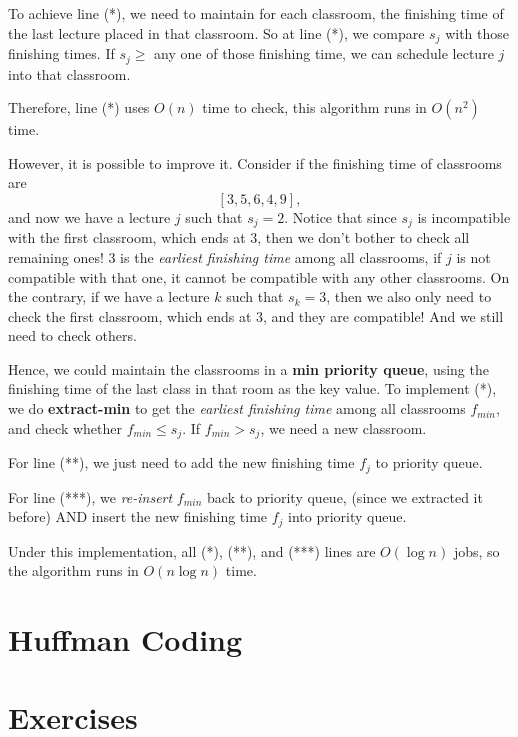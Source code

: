 \begin{spacing}{1.3}
    To achieve line (*), we need to maintain for each classroom, the finishing time 
    of the last lecture placed in that classroom. So at line (*), we compare 
    $s_j$ with those finishing times. If $s_j\ge $ any one of those finishing time,
    we can schedule lecture $j$ into that classroom.

    Therefore, line (*) uses $O(n)$ time to check, this algorithm runs in $O(n^2)$ time.

    However, it is possible to improve it. Consider if the finishing time of 
    classrooms are
    $$[3, 5, 6, 4, 9],$$
    and now we have a lecture $j$ such that $s_j=2$. Notice that since $s_j$ is 
    incompatible with the first classroom, which ends at 3, then we don't bother 
    to check all remaining ones! 3 is the {\it earliest finishing time} among all 
    classrooms, if $j$ is not compatible with that one, it cannot be compatible
    with any other classrooms. On the contrary, if we have a lecture $k$ such that 
    $s_k=3$, then we also only need to check the first classroom, which ends at 3, 
    and they are compatible! And we still need to check others.

    Hence, we could maintain the classrooms in a {\bf min priority queue}, 
    using the finishing time of the last class in that room as the key value.
    To implement (*), we do {\bf extract-min} to get the {\it earliest finishing
    time} among all classrooms $f_{min}$, and check whether $f_{min}\le s_j$.
    If $f_{min}> s_j$, we need a new classroom.

    For line (**), we just need to add the new finishing time $f_j$ to 
    priority queue.

    For line (***), we {\it re-insert} $f_{min}$ back to priority queue,
    (since we extracted it before) AND 
    insert the new finishing time $f_j$ into priority queue.

    Under this implementation, all (*), (**), and (***) lines are $O(\log n)$
    jobs, so the algorithm runs in $O(n\log n)$ time.



    \section{Huffman Coding}





    



    \newpage
    \section{Exercises}


\end{spacing}
